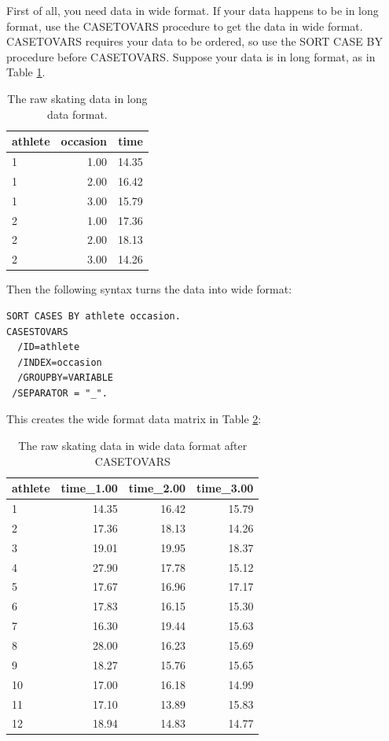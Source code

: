 \documentclass[]{book}\usepackage[]{graphicx}\usepackage[]{color}
\begin{document}
First of all, you need data in wide format. If your data happens to be in long format, use the CASETOVARS procedure to get the data in wide format. CASETOVARS requires your data to be ordered, so use the SORT CASE BY procedure before CASETOVARS. Suppose your data is in long format, as in Table \ref{tab:nonparmixed_6}.

\begin{table}[ht]
\centering
\caption{The raw skating data in long data format.} 
\label{tab:nonparmixed_6}
\begin{tabular}{lrr}
  \hline
athlete & occasion & time \\ 
  \hline
1 & 1.00 & 14.35 \\ 
  1 & 2.00 & 16.42 \\ 
  1 & 3.00 & 15.79 \\ 
  2 & 1.00 & 17.36 \\ 
  2 & 2.00 & 18.13 \\ 
  2 & 3.00 & 14.26 \\ 
   \hline
\end{tabular}
\end{table}



Then the following syntax turns the data into wide format:


\begin{verbatim}
SORT CASES BY athlete occasion.
CASESTOVARS
  /ID=athlete
  /INDEX=occasion
  /GROUPBY=VARIABLE
 /SEPARATOR = "_".
\end{verbatim}


This creates the wide format data matrix in Table \ref{tab:nonparmixed_7}:


\begin{table}[ht]
\centering
\caption{The raw skating data in wide data format after CASETOVARS} 
\label{tab:nonparmixed_7}
\begin{tabular}{lrrr}
  \hline
athlete & time\_1.00 & time\_2.00 & time\_3.00 \\ 
  \hline
1 & 14.35 & 16.42 & 15.79 \\ 
  2 & 17.36 & 18.13 & 14.26 \\ 
  3 & 19.01 & 19.95 & 18.37 \\ 
  4 & 27.90 & 17.78 & 15.12 \\ 
  5 & 17.67 & 16.96 & 17.17 \\ 
  6 & 17.83 & 16.15 & 15.30 \\ 
  7 & 16.30 & 19.44 & 15.63 \\ 
  8 & 28.00 & 16.23 & 15.69 \\ 
  9 & 18.27 & 15.76 & 15.65 \\ 
  10 & 17.00 & 16.18 & 14.99 \\ 
  11 & 17.10 & 13.89 & 15.83 \\ 
  12 & 18.94 & 14.83 & 14.77 \\ 
   \hline
\end{tabular}
\end{table}
\end{document}
